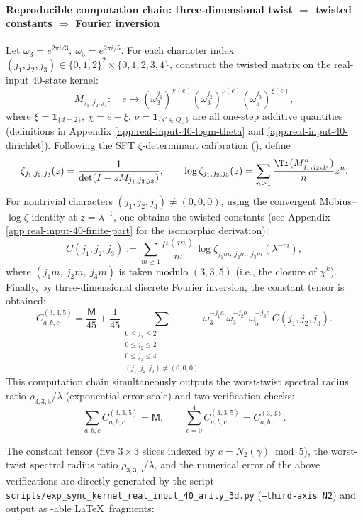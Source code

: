 \paragraph{Reproducible computation chain: three-dimensional twist $\Rightarrow$ twisted constants $\Rightarrow$ Fourier inversion}
Let $\omega_3=e^{2\pi i/3},\ \omega_5=e^{2\pi i/5}$. For each character index $(j_1,j_2,j_3)\in\{0,1,2\}^2\times\{0,1,2,3,4\}$, construct the twisted matrix on the real-input 40-state kernel:
$$
M_{j_1,j_2,j_3}:\quad
e\mapsto (\omega_3^{j_1})^{\chi(e)}(\omega_3^{j_2})^{\nu(e)}(\omega_5^{j_3})^{\xi(e)},
$$
where $\xi=\mathbf{1}_{\{d=2\}}$, $\chi=e-\xi$, $\nu=\mathbf{1}_{\{s'\in Q_-\}}$ are all one-step additive quantities (definitions in Appendix \ref{app:real-input-40-logm-theta} and \ref{app:real-input-40-dirichlet}).
Following the SFT $\zeta$-determinant calibration (\cite{BrinStuck2002}), define
$$
\zeta_{j_1,j_2,j_3}(z)=\frac{1}{\det(I-zM_{j_1,j_2,j_3})},
\qquad
\log\zeta_{j_1,j_2,j_3}(z)=\sum_{n\ge 1}\frac{\Tr(M_{j_1,j_2,j_3}^n)}{n}z^n.
$$
For nontrivial characters $(j_1,j_2,j_3)\neq(0,0,0)$, using the convergent M\"{o}bius--$\log\zeta$ identity at $z=\lambda^{-1}$, one obtains the twisted constants (see Appendix \ref{app:real-input-40-finite-part} for the isomorphic derivation):
$$
C(j_1,j_2,j_3):=\sum_{m\ge 1}\frac{\mu(m)}{m}\log\zeta_{j_1m,\ j_2m,\ j_3m}(\lambda^{-m}),
$$
where $(j_1m,\ j_2m,\ j_3m)$ is taken modulo $(3,3,5)$ (i.e., the closure of \(\chi^{k}\)). Finally, by three-dimensional discrete Fourier inversion, the constant tensor is obtained:
$$
C^{(3,3,5)}_{a,b,c}
=\frac{\mathsf{M}}{45}
+\frac{1}{45}\!\!\!\sum_{\substack{0\le j_1\le 2\\0\le j_2\le 2\\0\le j_3\le 4\\(j_1,j_2,j_3)\ne(0,0,0)}}
\omega_3^{-j_1 a}\,\omega_3^{-j_2 b}\,\omega_5^{-j_3 c}\ C(j_1,j_2,j_3).
$$
This computation chain simultaneously outputs the worst-twist spectral radius ratio $\rho_{3,3,5}/\lambda$ (exponential error scale) and two verification checks:
$$
\sum_{a,b,c}C^{(3,3,5)}_{a,b,c}=\mathsf{M},
\qquad
\sum_{c=0}^{4}C^{(3,3,5)}_{a,b,c}=C^{(3,3)}_{a,b}.
$$

The constant tensor (five $3\times 3$ slices indexed by $c=N_2(\gamma)\bmod 5$), the worst-twist spectral radius ratio $\rho_{3,3,5}/\lambda$, and the numerical error of the above verifications are directly generated by the script
\texttt{scripts/exp\_sync\_kernel\_real\_input\_40\_arity\_3d.py}
(\texttt{--third-axis N2}) and output as \verb||-able \LaTeX\ fragments:



